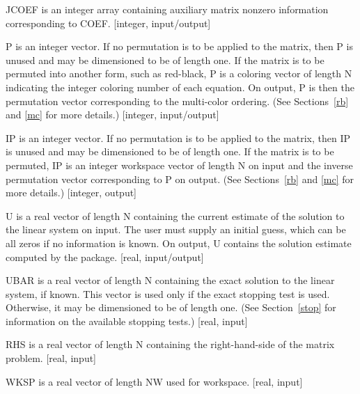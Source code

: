 \begin{list}{}{
               \leftmargin 1.00in \rightmargin 0.25in}
 \item[JCOEF \hfill]
           is an integer array containing auxiliary matrix nonzero
           information corresponding to COEF. [integer, input/output]
 
 \item[P \hfill]
           is an integer vector.  If no permutation is to be applied
           to the matrix, then P is unused and may be dimensioned
           to be of length one.
           If the matrix is to be permuted into another
           form, such as red-black, P is a coloring vector of length N
           indicating the integer coloring number of each equation.
           On output, P is then the permutation vector corresponding
           to the multi-color ordering.  (See Sections~\ref{rb} and 
           \ref{mc} for more details.) [integer, input/output]
 
 \item[IP \hfill]
           is an integer vector.  If no permutation is to be applied
           to the matrix, then IP is unused and may be dimensioned
           to be of length one.
           If the matrix is to be permuted, IP is an integer workspace
           vector of length N on input and the inverse permutation
           vector corresponding to P on output.  (See Sections~\ref{rb}
           and \ref{mc} for more details.) [integer, output]
 
 \item[U \hfill]
           is a real vector of length N containing the current
           estimate of the solution to the linear system on
           input.  The user must supply an initial guess, which
           can be all zeros if no information is known.  On
           output, U contains the solution estimate computed by
           the package. [real, input/output]
 
 \item[UBAR \hfill]
           is a real vector of length N containing the exact solution
           to the linear system, if known.  This vector is used
           only if the exact stopping test is used.  Otherwise,
           it may be dimensioned to be of length one.  (See
           Section~\ref{stop} for information on the available 
           stopping tests.) [real, input]
 
 \item[RHS \hfill]
           is a real vector of length N containing the right-hand-side
           of the matrix problem. [real, input]
 
 \item[WKSP \hfill]
           is a real vector of length NW used for workspace.
           [real, input]
 

\end{list}
